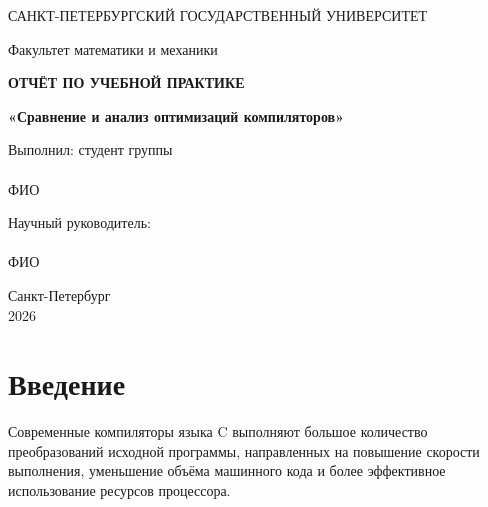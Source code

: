 \documentclass[12pt,a4paper]{article}
\begin{document}
\begin{titlepage}
\begin{center}

САНКТ-ПЕТЕРБУРГСКИЙ ГОСУДАРСТВЕННЫЙ УНИВЕРСИТЕТ

\vspace{1cm}

Факультет математики и механики

\vfill

{\Large \textbf{ОТЧЁТ ПО УЧЕБНОЙ ПРАКТИКЕ}}

\vspace{0.5cm}

{\large \textbf{«Сравнение и анализ оптимизаций компиляторов»}}

\vfill

\begin{flushright}
Выполнил: студент группы \underline{\hspace{3cm}}\\
\underline{\hspace{6cm}}\\
ФИО

\vspace{0.7cm}

Научный руководитель:\\
\underline{\hspace{6cm}}\\
ФИО
\end{flushright}

\vfill

Санкт-Петербург\\
2026

\end{center}
\end{titlepage}

\tableofcontents
\newpage

\section{Введение}

Современные компиляторы языка C выполняют большое количество преобразований исходной программы, направленных на повышение скорости выполнения, уменьшение объёма машинного кода и более эффективное использование ресурсов процессора.
\end{document}
